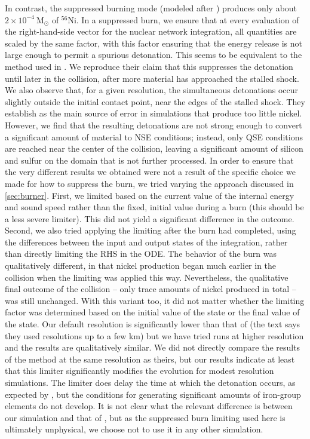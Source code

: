 \documentclass[twocolumn,numberedappendix]{../aastex6}
\newcommand{\msolar}{\mathrm{M}_\odot}
\begin{document}
In contrast, the suppressed burning mode (modeled after \citet{kushnir:2013}) produces only about
$2 \times 10^{-4}\ \msolar$ of $^{56}$Ni. In a suppressed burn, we ensure that at every evaluation
of the right-hand-side vector for the nuclear network integration, all quantities are scaled by the
same factor, with this factor ensuring that the energy release is not large enough to permit a
spurious detonation. This seems to be equivalent to the method used in \citet{kushnir:2013}. We
reproduce their claim that this suppresses the detonation until later in the collision, after more
material has approached the stalled shock. We also observe that, for a given resolution, the simultaneous
detonations occur slightly outside the initial contact point, near the edges of the stalled shock. They
establish as the main source of error in simulations that produce too little nickel. However, we find
that the resulting detonations are not strong enough to convert a significant amount of material to NSE
conditions; instead, only QSE conditions are reached near the center of the collision, leaving a significant
amount of silicon and sulfur on the domain that is not further processed. In order to ensure that the
very different results we obtained were not a result of the specific choice we made for how to suppress
the burn, we tried varying the approach discussed in \autoref{sec:burner}. First, we limited based on
the current value of the internal energy and sound speed rather than the fixed, initial value during a burn
(this should be a less severe limiter). This did not yield a significant difference in the outcome. Second,
we also tried applying the limiting after the burn had completed, using the differences between the input
and output states of the integration, rather than directly limiting the RHS in the ODE. The behavior of the
burn was qualitatively different, in that nickel production began much earlier in the collision when the limiting
was applied this way. Nevertheless, the qualitative final outcome of the collision -- only trace amounts
of nickel produced in total -- was still unchanged. With this variant too, it did not matter whether the limiting
factor was determined based on the initial value of the state or the final value of the state.
Our default resolution is significantly lower than that of \citeauthor{kushnir:2013} (the text
says they used resolutions up to a few km) but we have tried runs at higher resolution and
the results are qualitatively similar. We did not directly compare the results of the method at
the same resolution as theirs, but our results indicate at least that this limiter significantly
modifies the evolution for modest resolution simulations. The limiter does delay the time at which
the detonation occurs, as expected by \citeauthor{kushnir:2013}, but the conditions for generating
significant amounts of iron-group elements do not develop. It is not clear what the relevant difference
is between our simulation and that of \citeauthor{kushnir:2013}, but as the suppressed burn limiting
used here is ultimately unphysical, we choose not to use it in any other simulation.
\end{document}

